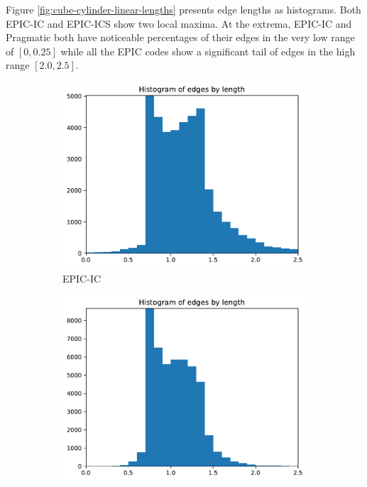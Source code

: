 \documentclass[3p,times,procedia,number]{elsarticle}
\begin{document}
Figure \ref{fig:cube-cylinder-linear-lengths} presents edge lengths
as histograms.
Both EPIC-IC and EPIC-ICS show two local maxima.
At the extrema, EPIC-IC and Pragmatic both have noticeable
percentages of their edges in the very low range of $[0,0.25]$
while all the EPIC codes show a significant tail of edges
in the high range $[2.0,2.5]$.
\begin{figure}
\begin{subfigure}{.16\textwidth}
\centering
\includegraphics[width=\textwidth]{epic-ic-cube-cylinder-linear-length.pdf}
\caption{EPIC-IC}
\end{subfigure}
\begin{subfigure}{.16\textwidth}
\centering
\includegraphics[width=\textwidth]{epic-ics-cube-cylinder-linear-length.pdf}

\end{subfigure}
\end{figure}
\end{document}
